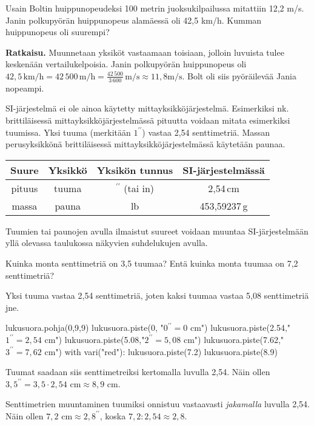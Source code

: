 \begin{esimerkki}
Usain Boltin huippunopeudeksi 100 metrin juoksukilpailussa mitattiin 12,2 m/s. Janin polkupyörän huippunopeus alamäessä oli 42,5 km/h. Kumman huippunopeus oli suurempi?

\textbf{Ratkaisu.}
Muunnetaan yksiköt vastaamaan toisiaan, jolloin luvuista tulee keskenään vertailukelpoisia. Janin polkupyörän huippunopeus oli $42,5\, \textrm{km/h} = 42\,500\,\textrm{m/h} = \frac{42\,500}{3\,600}\,\textrm{m/s} \approx 11,8 \textrm{m/s}$.
Bolt oli siis pyöräilevää Jania nopeampi.
\end{esimerkki}

SI-järjestelmä ei ole ainoa käytetty mittayksikköjärjestelmä. Esimerkiksi nk. brittiläisessä mittayksikköjärjestelmässä pituutta voidaan mitata esimerkiksi tuumissa. Yksi tuuma (merkitään $1^{\prime \prime}$) vastaa 2,54 senttimetriä. Massan perusyksikkönä brittiläisessä mittayksikköjärjestelmässä käytetään paunaa.

\begin{tabular}{c|c|c|c}
Suure & Yksikkö & Yksikön tunnus & SI-järjestelmässä\\
\hline
pituus & tuuma & $^{\prime \prime}$ (tai in) & 2,54\,cm \\
massa & pauna & lb & 453,59237\,g \\
\end{tabular}

Tuumien tai paunojen avulla ilmaistut suureet voidaan muuntaa SI-järjestelmään yllä olevassa taulukossa näkyvien suhdelukujen avulla.

\begin{esimerkki}
Kuinka monta senttimetriä on 3,5 tuumaa? Entä kuinka monta tuumaa on 7,2 senttimetriä?

	\begin{esimratk}
Yksi tuuma vastaa 2,54 senttimetriä, joten kaksi tuumaa vastaa 5,08 senttimetriä jne.
	
\begin{kuva}
	lukusuora.pohja(0,9,9)
	lukusuora.piste(0, "$0^{\prime \prime} = 0 $ cm")
	lukusuora.piste(2.54,"$1^{\prime \prime} = 2,54$ cm")
	lukusuora.piste(5.08,"$2^{\prime \prime} = 5,08$ cm")
	lukusuora.piste(7.62,"$3^{\prime \prime} = 7,62$ cm")
	with vari("red"):
	  lukusuora.piste(7.2)
	  lukusuora.piste(8.9)
\end{kuva}

Tuumat saadaan siis senttimetreiksi kertomalla luvulla 2,54. Näin ollen $3,5^{\prime \prime} = 3,5 \cdot 2,54 \textrm{ cm} \approx 8,9 \textrm{ cm}$.

Senttimetrien muuntaminen tuumiksi onnistuu vastaavasti \emph{jakamalla} luvulla 2,54. Näin ollen $7,2 \textrm{ cm} \approx 2,8^{\prime \prime}$, koska $7,2 : 2,54 \approx 2,8$.
	\end{esimratk}
\end{esimerkki}

